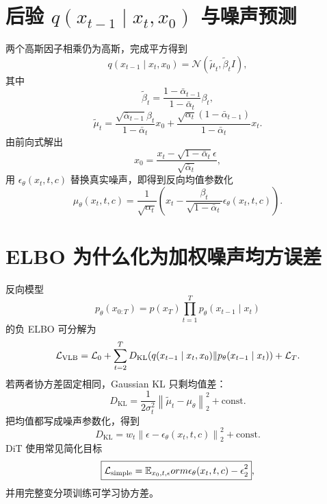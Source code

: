 \documentclass[UTF8,12pt,a4paper,fontset=none]{ctexart}
\numberwithin{equation}{section}
\newcommand{\E}{\mathbb{E}}
\newcommand{\Loss}{\mathcal{L}}
\newcommand{\norm}[1]{\left\lVert #1\right\rVert}
\newcommand{\KL}{D_{\mathrm{KL}}}
\begin{document}
\section{后验 $q(x_{t-1}\mid x_t,x_0)$ 与噪声预测}
两个高斯因子相乘仍为高斯，完成平方得到
\begin{equation}
 q(x_{t-1}\mid x_t,x_0)=\mathcal N(\widetilde\mu_t,\widetilde\beta_tI),
\end{equation}
其中
\begin{equation}
 \widetilde\beta_t=\frac{1-\bar\alpha_{t-1}}{1-\bar\alpha_t}\beta_t,
\end{equation}
\begin{equation}
 \widetilde\mu_t=
 \frac{\sqrt{\bar\alpha_{t-1}}\beta_t}{1-\bar\alpha_t}x_0+
 \frac{\sqrt{\alpha_t}(1-\bar\alpha_{t-1})}{1-\bar\alpha_t}x_t.
\end{equation}
由前向式解出
\begin{equation}
 x_0=\frac{x_t-\sqrt{1-\bar\alpha_t}\epsilon}{\sqrt{\bar\alpha_t}},
\end{equation}
用 $\epsilon_\theta(x_t,t,c)$ 替换真实噪声，即得到反向均值参数化
\begin{equation}
 \mu_\theta(x_t,t,c)=\frac1{\sqrt{\alpha_t}}
 \left(x_t-\frac{\beta_t}{\sqrt{1-\bar\alpha_t}}\epsilon_\theta(x_t,t,c)\right).
\end{equation}

\section{ELBO 为什么化为加权噪声均方误差}
反向模型
\begin{equation}
 p_\theta(x_{0:T})=p(x_T)\prod_{t=1}^{T}p_\theta(x_{t-1}\mid x_t)
\end{equation}
的负 ELBO 可分解为
\begin{equation}
 \Loss_{\rm VLB}=\Loss_0+\sum_{t=2}^{T}
 \KL(q(x_{t-1}\mid x_t,x_0)\Vert p_\theta(x_{t-1}\mid x_t))+\Loss_T.
\end{equation}
若两者协方差固定相同，Gaussian KL 只剩均值差：
\begin{equation}
 \KL=\frac{1}{2\sigma_t^2}\norm{\widetilde\mu_t-\mu_\theta}_2^2+\text{const}.
\end{equation}
把均值都写成噪声参数化，得到
\begin{equation}
 \KL=w_t\norm{\epsilon-\epsilon_\theta(x_t,t,c)}_2^2+\text{const}.
\end{equation}
DiT 使用常见简化目标
\begin{equation}
 \boxed{\Loss_{\rm simple}=\E_{x_0,t,\epsilon}
orm{\epsilon_\theta(x_t,t,c)-\epsilon}_2^2},
\end{equation}
并用完整变分项训练可学习协方差。
\end{document}
